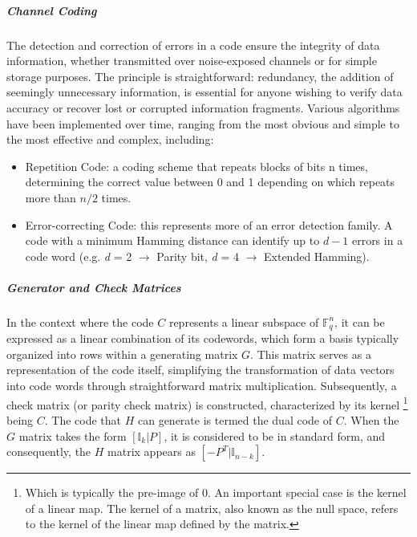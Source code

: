\subparagraph{Channel Coding}
The detection and correction of errors in a code ensure the integrity of data information, whether transmitted over noise-exposed channels or for simple storage purposes. The principle is straightforward: redundancy, the addition of seemingly unnecessary information, is essential for anyone wishing to verify data accuracy or recover lost or corrupted information fragments. Various algorithms have been implemented over time, ranging from the most obvious and simple to the most effective and complex, including:\begin{itemize}                                                                                                                                                                                                                                                                                                                                                                                                                                                                                                                                   \item Repetition Code: a coding scheme that repeats blocks of bits n times, determining the correct value between 0 and 1 depending on which repeats more than $n/2$ times.                                                                                                                                                                                                                                                  \item Error-correcting Code: this represents more of an error detection family. A code with a minimum Hamming distance can identify up to $d - 1$ errors in a code word (e.g. \textit{d} = 2 $\rightarrow$ Parity bit, \textit{d} = 4 $\rightarrow$ Extended Hamming).                                                                                                                                                                                                                        \end{itemize}

\subparagraph{Generator and Check Matrices}
In the context where the code $C$ represents a linear subspace of $\mathbb{F}_q^n$, it can be expressed as a linear combination of its codewords, which form a basis typically organized into rows within a generating matrix $G$. This matrix serves as a representation of the code itself, simplifying the transformation of data vectors into code words through straightforward matrix multiplication. Subsequently, a check matrix (or parity check matrix) is constructed, characterized by its kernel \footnote{Which is typically the pre-image of 0. An important special case is the kernel of a linear map. The kernel of a matrix, also known as the null space, refers to the kernel of the linear map defined by the matrix.} being $C$. The code that $H$ can generate is termed the dual code of $C$. When the $G$ matrix takes the form $[\mathbb{I}_k | P]$, it is considered to be in standard form, and consequently, the $H$ matrix appears as $[-P^T | \mathbb{I}_{n-k}]$.

